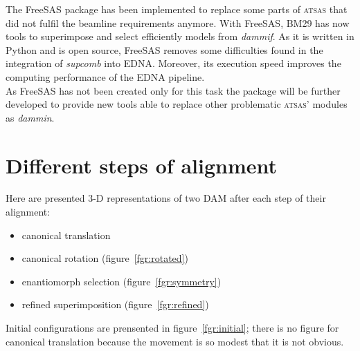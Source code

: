 \documentclass[a4paper, 11pt]{report}
\begin{document}
The FreeSAS package has been implemented to replace some parts of 
\textsc{atsas} that did not fulfil the beamline requirements anymore. 
With FreeSAS, BM29 has now tools to superimpose and select efficiently 
models from \textit{dammif}. 
As it is written in Python and is open source, FreeSAS removes some 
difficulties found in the integration of \textit{supcomb} into EDNA. 
Moreover, its execution speed improves the computing performance of 
the EDNA pipeline.\\

As FreeSAS has not been created only for this task the package will be 
further developed to provide new tools able to replace other 
problematic \textsc{atsas}' modules as \textit{dammin}.


\newpage                 %



\appendix


\chapter{Different steps of alignment}
\label{alignstep}

Here are presented 3-D representations of two DAM after each step of 
their alignment:
\begin{itemize}
\item canonical translation
\item canonical rotation (figure~\ref{fgr:rotated})
\item enantiomorph selection (figure~\ref{fgr:symmetry})
\item refined superimposition (figure~\ref{fgr:refined})
\end{itemize}
Initial configurations are prensented in figure~\ref{fgr:initial}; there is 
no figure for canonical translation because the movement is so modest 
that it is not obvious.
\end{document}
